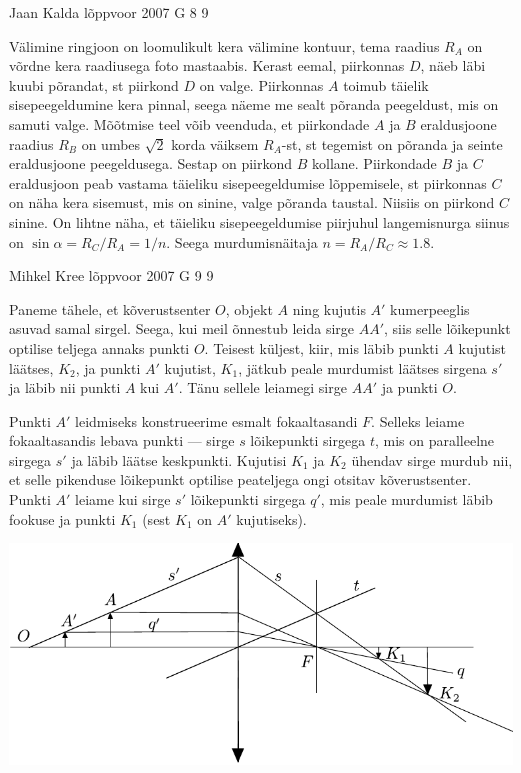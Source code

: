 \documentclass[11pt]{article}
\begin{document}
{%
{Jaan Kalda} %
{lõppvoor} %
{2007} %
{G 8} %
{9} %
{

\ifSolution
Välimine ringjoon on loomulikult kera välimine kontuur, tema raadius $R_A$ on võrdne kera raadiusega foto mastaabis. Kerast eemal, piirkonnas $D$, näeb läbi kuubi põrandat, st piirkond $D$ on valge. Piirkonnas $A$ toimub täielik sisepeegeldumine kera pinnal, seega näeme me sealt põranda peegeldust, mis on samuti valge. Mõõtmise teel võib veenduda, et piirkondade $A$ ja $B$ eraldusjoone raadius $R_B$ on umbes $\sqrt 2$ korda väiksem $R_A$-st, st tegemist on põranda ja seinte eraldusjoone peegeldusega. Sestap on piirkond $B$ kollane. Piirkondade $B$ ja $C$ eraldusjoon peab vastama täieliku sisepeegeldumise lõppemisele, st piirkonnas $C$ on näha kera sisemust, mis on sinine, valge põranda taustal. Niisiis on piirkond $C$ sinine. On lihtne näha, et täieliku sisepeegeldumise piirjuhul langemisnurga siinus on $\sin \alpha = R_C/R_A = 1/n$. Seega murdumisnäitaja $n = R_A/R_C \approx \num{1,8}$.
\fi
}

{Mihkel Kree} %
{lõppvoor} %
{2007} %
{G 9} %
{9} %
{

\ifSolution
Paneme tähele, et kõverustsenter $O$, objekt $A$ ning kujutis $A'$ kumerpeeglis asuvad samal sirgel. Seega, kui meil õnnestub leida sirge $AA'$, siis selle lõikepunkt optilise teljega annaks punkti $O$. Teisest küljest, kiir, mis läbib punkti $A$ kujutist läätses, $K_2$, ja punkti $A'$ kujutist, $K_1$, jätkub peale murdumist läätses sirgena $s'$ ja läbib nii punkti $A$ kui $A'$. Tänu sellele leiamegi sirge $AA'$ ja punkti $O$.

Punkti $A'$ leidmiseks konstrueerime esmalt fokaaltasandi $F$. Selleks leiame fokaaltasandis lebava punkti --- sirge $s$ lõikepunkti sirgega $t$, mis on paralleelne sirgega $s'$ ja läbib läätse keskpunkti. Kujutisi $K_1$ ja $K_2$ ühendav sirge murdub nii, et selle pikenduse lõikepunkt optilise peateljega ongi otsitav kõverustsenter. Punkti $A'$ leiame kui sirge $s'$ lõikepunkti sirgega $q'$, mis peale murdumist läbib fookuse ja punkti $K_1$ (sest $K_1$ on $A'$ kujutiseks).


\begin{center}
	\includegraphics[width=\linewidth]{2007-v3g-09-lah}
\end{center}
\fi
}

}
\end{document}
